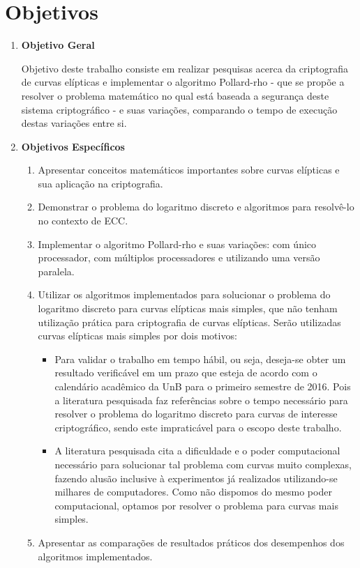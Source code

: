 \section*{Objetivos}
\begin{enumerate}
	\item \textbf{Objetivo Geral}

Objetivo deste trabalho consiste em realizar pesquisas acerca da criptografia de curvas elípticas e implementar o algoritmo Pollard-rho - que se propõe a resolver o problema matemático no qual está baseada a segurança deste sistema criptográfico - e suas variações, comparando o tempo de execução destas variações entre si.

	\item \textbf{Objetivos Específicos}
	\begin{enumerate}
		\item Apresentar conceitos matemáticos importantes sobre curvas elípticas e sua aplicação na criptografia.
		\item Demonstrar o problema do logaritmo discreto e algoritmos para resolvê-lo no contexto de ECC.
		\item Implementar o algoritmo Pollard-rho e suas variações: com único processador, com múltiplos processadores e utilizando uma versão paralela.
		\item Utilizar os algoritmos implementados para solucionar o problema do logaritmo discreto para curvas elípticas mais simples, que não tenham utilização prática para criptografia de curvas elípticas. Serão utilizadas curvas elípticas mais simples por dois motivos:
		\begin{itemize}
			\item Para validar o trabalho em tempo hábil, ou seja, deseja-se obter um resultado verificável em um prazo que esteja de acordo com o calendário acadêmico da UnB para o primeiro semestre de 2016. Pois a literatura pesquisada faz referências sobre o tempo necessário para resolver o problema do logaritmo discreto para curvas de interesse criptográfico, sendo este impraticável para o escopo deste trabalho.
			\item A literatura pesquisada cita a dificuldade e o poder computacional necessário para solucionar tal problema com curvas muito complexas, fazendo alusão inclusive à experimentos já realizados utilizando-se milhares de computadores. Como não dispomos do mesmo poder computacional, optamos por resolver o problema para curvas mais simples.
		\end{itemize}
		\item Apresentar as comparações de resultados práticos dos desempenhos dos algoritmos implementados.
	\end{enumerate}
\end{enumerate}
